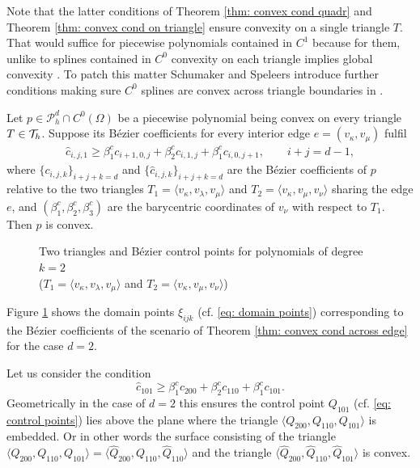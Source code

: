 Note that the latter conditions of Theorem \ref{thm: convex cond quadr} and Theorem \ref{thm: convex cond on triangle} ensure convexity on a single triangle $T$. That would suffice for piecewise polynomials contained in $C^1$ because for them, unlike to splines contained in $C^0$ convexity on each triangle implies global convexity \cite[Theorem 3.1.]{SS2010}. To patch this matter Schumaker and Speleers introduce further conditions making sure $C^0$ splines are convex across triangle boundaries in \cite{SS2014}.
\begin{theorem}\label{thm: convex cond across edge}
	Let $p \in \mathcal P^d_h \cap C^0(\Omega)$ be a piecewise polynomial being convex on every triangle $T \in \mathcal{T}_h$. Suppose its B\'ezier coefficients for every interior edge $e =(v_\kappa, v_\mu)$ fulfil 
	\begin{align}
		{\hat c_{i,j,1}}  \geq  \beta_1^c c_{i+1, 0,j} +\beta_2^c c_{i,1,j} + \beta_1^c c_{i, 0,j+1}, \qquad i+j=d-1, \label{eq: convexity across edge}
	\end{align}
where  $\{c_{i,j,k}\}_{i+j+k=d}$ and $\{ {\hat c_{i,j,k}}\}_{i+j+k=d}$ are the B\'ezier coefficients of $p$ relative to the two triangles $T_1 = \langle v_\kappa, v_\lambda, v_\mu \rangle$ and $T_2 = \langle v_\kappa, v_\mu, v_\nu \rangle$ sharing the edge $e$, and $(\beta_1^c,\beta_2^c,\beta_3^c)$ are the barycentric coordinates of $v_\nu$ with respect to $T_1$. Then $p$ is convex.
\end{theorem}

\begin{figure}[H]
	
	\caption{Two triangles and B\'ezier control points for polynomials of degree $k=2$ \\($T_1 = \langle v_\kappa, v_\lambda, v_\mu \rangle$ and $T_2 = \langle v_\kappa, v_\mu, v_\nu \rangle$)}
	\label{fig: convexity condition}
\end{figure}
Figure \ref{fig: convexity condition} shows the domain points $\xi_{ijk}$ (cf. \eqref{eq: domain points}) corresponding to the B\'ezier coefficients of the scenario of Theorem \ref{thm: convex cond across edge} for the case $d=2$.

 Let us consider the condition
\[
		{\hat c_{101}} \geq \beta_1^c c_{200} +\beta_2^c c_{110} + \beta_1^c c_{101}.
\]
Geometrically in the case of $d=2$ this ensures the control point $Q_{101}$ (cf. \eqref{eq: control points}) lies above the plane where the triangle $\langle Q_{200}, Q_{110}, Q_{101} \rangle$ is embedded. %
Or in other words the surface consisting of the triangle $\langle Q_{200}, Q_{110}, Q_{101} \rangle= \langle \hat Q_{200}, Q_{110}, \hat Q_{110} \rangle$  and the triangle $\langle \hat Q_{200}, \hat Q_{110}, \hat Q_{101} \rangle$ is convex.

